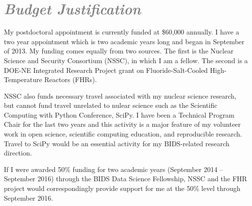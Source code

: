 \documentclass[a4paper, 10pt]{article}
\begin{document}
\section*{\textcolor{gray}{\it Budget Justification}}
My postdoctoral appointment is currently funded at \$60,000 annually. I have a
two year appointment which is two academic years long and began in September of
2013.  My funding comes equally from two sources. The first is the Nuclear
Science and Security Consortium (NSSC), in which I am a fellow. The second is a
DOE-NE Integrated Research Project grant on Fluoride-Salt-Cooled
High-Temperature Reactors (FHRs).  

NSSC also funds necessary travel associated with my nuclear science research,
but cannot fund travel unrelated to nulear science such as the Scientific
Computing with Python Conference, SciPy. I have been a Technical
Program Chair for the last two years and this activity is a major feature of my
volunteer work in open science, scientific computing education, and
reproducible research. Travel to SciPy would be an essential activity for my
BIDS-related research direction.

If I were awarded 50\% funding for two academic years (September 2014 --
September 2016) through the BIDS Data Science Fellowship, NSSC and the FHR
project would correspondingly provide support for me at the 50\% level through
September 2016.
\end{document}
